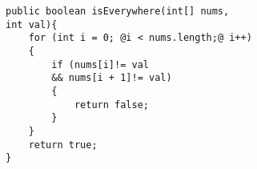 \begin{lstlisting}[style=customJava]
public boolean isEverywhere(int[] nums,
int val){
    for (int i = 0; @i < nums.length;@ i++)
    {
        if (nums[i]!= val 
        && nums[i + 1]!= val)
        {
            return false;
        }
    }
    return true;
}
\end{lstlisting}
